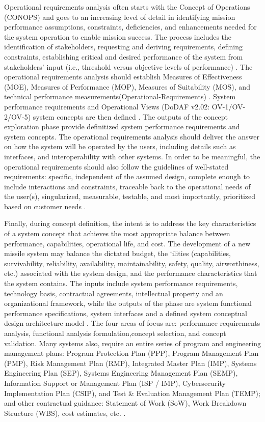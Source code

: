 \documentclass[num-refs]{wiley-article}
\begin{document}
Operational requirements analysis often starts with the Concept of Operations (CONOPS) and goes to an increasing level of detail in identifying mission performance assumptions, constraints, deficiencies, and enhancements needed for the system operation to enable mission success. The process includes the identification of stakeholders, requesting and deriving requirements, defining constraints, establishing critical and desired performance of the system from stakeholders' input (i.e., threshold versus objective levels of performance) \cite{ChiefInformationOfficer2010}. The operational requirements analysis should establish Measures of Effectiveness (MOE), Measures of Performance (MOP), Measures of Suitability (MOS), and technical performance measurements(Operational-Requirements) \cite{StarnellPeter1991}. System performance requirements and Operational Views (DoDAF v2.02: OV-1/OV-2/OV-5) system concepts are then defined \cite{ChiefInformationOfficer2010}. The outputs of the concept exploration phase provide definitized system performance requirements and system concepts. The operational requirements analysis should deliver the answer on how the system will be operated by the users, including details such as interfaces, and interoperability with other systems. In order to be meaningful, the operational requirements should also follow the guidelines of well-stated requirements: specific, independent of the assumed design, complete enough to include interactions and constraints, traceable back to the operational needs of the user(s), singularized, measurable, testable, and most importantly, prioritized based on customer needs \cite{Kossiakoff2011}.

Finally, during concept definition, the intent is to address the key characteristics of a system concept that achieves the most appropriate balance between performance, capabilities, operational life, and cost. The development of a new missile system may balance the dictated budget, the `ilities (capabilities, survivability, reliability, availability, maintainability, safety, quality, airworthiness, etc.) \cite{NASAHandbook2016} associated with the system design, and the performance characteristics that the system contains. The inputs include system performance requirements, technology basis, contractual agreements, intellectual property and an organizational framework, while the outputs of the phase are system functional performance specifications, system interfaces and a defined system conceptual design  architecture model \cite{Casse2017}. The four areas of focus are: performance requirements analysis, functional analysis formulation,concept selection, and concept validation. Many systems also, require an entire series of program and engineering management plans: Program Protection Plan (PPP), Program Management Plan (PMP), Risk Management Plan (RMP), Integrated Master Plan (IMP), Systems Engineering Plan (SEP), Systems Engineering Management Plan (SEMP), Information Support or Management Plan (ISP / IMP), Cybersecurity Implementation Plan (CSIP), and Test \& Evaluation Management Plan (TEMP); and other
contractual guidance: Statement of Work (SoW), Work Breakdown Structure (WBS), cost estimates, etc. \cite{NASAHandbook2016}.
\end{document}
